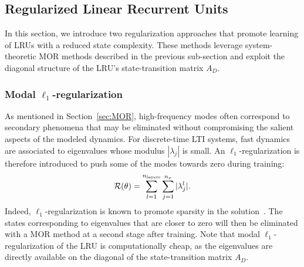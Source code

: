 \documentclass{article} %
\newcommand{\regfun}{\mathcal{R}}
\newcommand{\nx}{{n_x}}
\newcommand{\nlayers}{{n_{\rm layers}}}
\begin{document}
\subsection{Regularized Linear Recurrent Units} \label{sec:reg}
In this section, we introduce two {regularization} approaches that promote learning of LRUs  with a reduced  state complexity. 
These methods leverage system-theoretic MOR methods described in the previous sub-section and  exploit the diagonal structure of the LRU's state-transition matrix $A_{D}$. 
\subsubsection{Modal $\ell_1$-regularization}

As mentioned in Section~\ref{sec:MOR}, high-frequency modes often correspond to secondary phenomena that may be eliminated without compromising the salient aspects of the modeled dynamics.
For discrete-time LTI systems, fast dynamics are associated to eigenvalues whose modulus $|\lambda_j|$ is small. 
An $\ell_1$-regularization is therefore introduced to push some of the modes towards zero during training:
\begin{equation}
    \label{eq:lasso}
    \regfun(\theta) = \sum_{l=1}^{\nlayers} \sum_{j=1}^{\nx} |\lambda_j^{l}|.
\end{equation}
Indeed, $\ell_1$-regularization is known to promote sparsity in the solution~\cite{tibshirani1996lasso}. The states corresponding to eigenvalues that are closer to zero 
will then be eliminated with a MOR method  at a second stage after training.  Note that modal $\ell_1$-regularization  of the LRU is computationally cheap, as the eigenvalues  are directly available on the diagonal of the
state-transition matrix $A_D$. 
\end{document}
